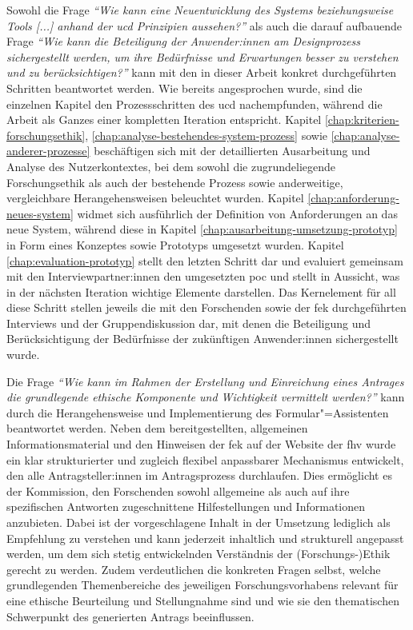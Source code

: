 \documentclass[a4paper,12pt,twoside]{scrreprt}
\begin{document}
Sowohl die Frage \textit{\enquote{Wie kann eine Neuentwicklung des Systems beziehungsweise Tools [...] anhand der \acl{ucd} Prinzipien aussehen?}} als auch die darauf aufbauende Frage \textit{\enquote{Wie kann die Beteiligung der Anwender:innen am Designprozess sichergestellt werden, um ihre Bedürfnisse und Erwartungen besser zu verstehen und zu berücksichtigen?}} kann mit den in dieser Arbeit konkret durchgeführten Schritten beantwortet werden. Wie bereits angesprochen wurde, sind die einzelnen Kapitel den Prozessschritten des \ac{ucd} nachempfunden, während die Arbeit als Ganzes einer kompletten Iteration entspricht. Kapitel \ref{chap:kriterien-forschungsethik}, \ref{chap:analyse-bestehendes-system-prozess} sowie \ref{chap:analyse-anderer-prozesse} beschäftigen sich mit der detaillierten Ausarbeitung und Analyse des Nutzerkontextes, bei dem sowohl die zugrundeliegende Forschungsethik als auch der bestehende Prozess sowie anderweitige, vergleichbare Herangehensweisen beleuchtet wurden. Kapitel \ref{chap:anforderung-neues-system} widmet sich ausführlich der Definition von Anforderungen an das neue System, während diese in Kapitel \ref{chap:ausarbeitung-umsetzung-prototyp} in Form eines Konzeptes sowie Prototyps umgesetzt wurden. Kapitel \ref{chap:evaluation-prototyp} stellt den letzten Schritt dar und evaluiert gemeinsam mit den Interviewpartner:innen den umgesetzten \ac{poc} und stellt in Aussicht, was in der nächsten Iteration wichtige Elemente darstellen. Das Kernelement für all diese Schritt stellen jeweils die mit den Forschenden sowie der \ac{fek} durchgeführten Interviews und der Gruppendiskussion dar, mit denen die Beteiligung und Berücksichtigung der Bedürfnisse der zukünftigen Anwender:innen sichergestellt wurde.

\medskip

Die Frage \textit{\enquote{Wie kann im Rahmen der Erstellung und Einreichung eines Antrages die grundlegende ethische Komponente und Wichtigkeit vermittelt werden?}} kann durch die Herangehensweise und Implementierung des Formular"=Assistenten beantwortet werden. Neben dem bereitgestellten, allgemeinen Informationsmaterial und den Hinweisen der \acl{fek} auf der Website der \ac{fhv} wurde ein klar strukturierter und zugleich flexibel anpassbarer Mechanismus entwickelt, den alle Antragsteller:innen im Antragsprozess durchlaufen. Dies ermöglicht es der Kommission, den Forschenden sowohl allgemeine als auch auf ihre spezifischen Antworten zugeschnittene Hilfestellungen und Informationen anzubieten. Dabei ist der vorgeschlagene Inhalt in der Umsetzung lediglich als Empfehlung zu verstehen und kann jederzeit inhaltlich und strukturell angepasst werden, um dem sich stetig entwickelnden Verständnis der (Forschungs-)Ethik gerecht zu werden. Zudem verdeutlichen die konkreten Fragen selbst, welche grundlegenden Themenbereiche des jeweiligen Forschungsvorhabens relevant für eine ethische Beurteilung und Stellungnahme sind und wie sie den thematischen Schwerpunkt des generierten Antrags beeinflussen.
\end{document}
